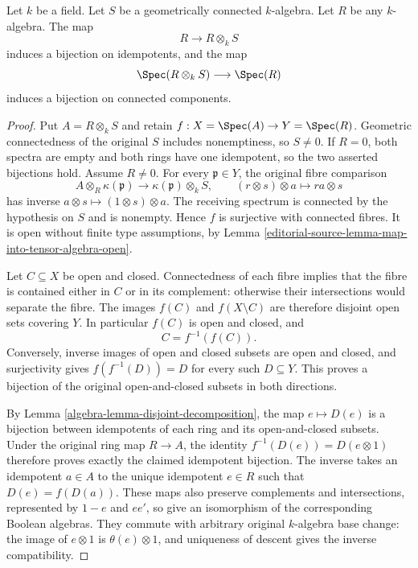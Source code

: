 \begin{lemma}
\label{editorial-source-lemma-geometrically-connected-any-base-change}
Let $k$ be a field.
Let $S$ be a geometrically connected $k$-algebra.
Let $R$ be any $k$-algebra.
The map
$$
R \longrightarrow R \otimes_k S
$$
induces a bijection on idempotents, and the map
$$
\Spec(R \otimes_k S) \longrightarrow \Spec(R)
$$
induces a bijection on connected components.
\end{lemma}

\begin{proof}
Put $A=R\otimes_k S$ and retain
$f:X=\Spec(A)\to Y=\Spec(R)$.
Geometric connectedness of the
original $S$ includes nonemptiness,
so $S\neq0$. If $R=0$, both
spectra are empty and both
rings have one idempotent,
so the two asserted bijections
hold. Assume $R\neq0$.
For every $\mathfrak p\in Y$,
the original fibre comparison
$$
A\otimes_R\kappa(\mathfrak p)\longrightarrow
\kappa(\mathfrak p)\otimes_k S,
\qquad(r\otimes s)\otimes a\longmapsto ra\otimes s
$$
has inverse $a\otimes s\mapsto(1\otimes s)\otimes a$.
The receiving spectrum is
connected by the hypothesis
on $S$ and is nonempty.
Hence $f$ is surjective with
connected fibres. It is open
without finite type assumptions,
by Lemma
\ref{editorial-source-lemma-map-into-tensor-algebra-open}.

Let $C\subseteq X$ be open
and closed. Connectedness
of each fibre implies that
the fibre is contained either
in $C$ or in its complement:
otherwise their intersections
would separate the fibre.
The images $f(C)$ and $f(X\setminus C)$
are therefore disjoint open
sets covering $Y$. In
particular $f(C)$ is open
and closed, and
$$
C=f^{-1}(f(C)).
$$
Conversely, inverse images of
open and closed subsets are
open and closed, and surjectivity
gives $f(f^{-1}(D))=D$ for
every such $D\subseteq Y$.
This proves a bijection of
the original open-and-closed
subsets in both directions.

By Lemma \ref{algebra-lemma-disjoint-decomposition},
the map $e\mapsto D(e)$ is
a bijection between idempotents
of each ring and its open-and-closed
subsets. Under the original
ring map $R\to A$, the
identity $f^{-1}(D(e))=D(e\otimes1)$
therefore proves exactly the
claimed idempotent bijection.
The inverse takes an idempotent
$a\in A$ to the unique
idempotent $e\in R$ such
that $D(e)=f(D(a))$.
These maps also preserve
complements and intersections,
represented by $1-e$ and
$ee'$, so give an isomorphism
of the corresponding Boolean
algebras. They commute with
arbitrary original $k$-algebra
base change: the image of
$e\otimes1$ is $\theta(e)\otimes1$,
and uniqueness of descent
gives the inverse compatibility.


\end{proof}
